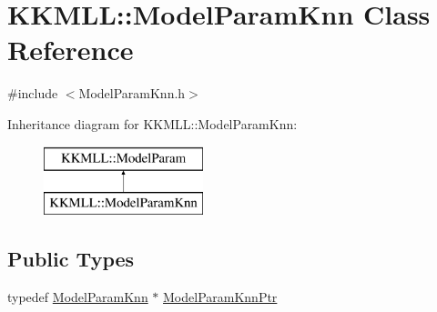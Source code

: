 \hypertarget{class_k_k_m_l_l_1_1_model_param_knn}{}\section{K\+K\+M\+LL\+:\+:Model\+Param\+Knn Class Reference}
\label{class_k_k_m_l_l_1_1_model_param_knn}


{\ttfamily \#include $<$Model\+Param\+Knn.\+h$>$}

Inheritance diagram for K\+K\+M\+LL\+:\+:Model\+Param\+Knn\+:\begin{figure}[H]
\begin{center}
\leavevmode
\includegraphics[height=2.000000cm]{class_k_k_m_l_l_1_1_model_param_knn}
\end{center}
\end{figure}
\subsection*{Public Types}
\begin{DoxyCompactItemize}
\item 
typedef \hyperlink{class_k_k_m_l_l_1_1_model_param_knn}{Model\+Param\+Knn} $\ast$ \hyperlink{class_k_k_m_l_l_1_1_model_param_knn_a0cb141b4f25bad4ccd11ac5a62a2cf43}{Model\+Param\+Knn\+Ptr}
\end{DoxyCompactItemize}
